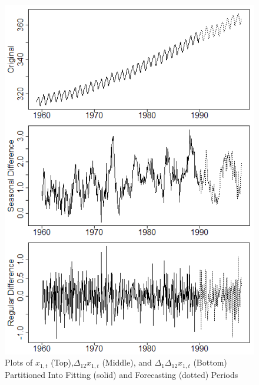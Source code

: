\begin{figure}[htbp]
	\centering
	\caption{Plots of $x_{1,t}$ (Top),$\Delta_{12}x_{1,t}$ (Middle), and $\Delta_1\Delta_{12}x_{1,t}$ (Bottom) Partitioned Into Fitting (solid) and Forecasting (dotted) Periods}
	\label{fig:co2plots}
	\includegraphics[scale=0.55]{co2plots}
\end{figure}

